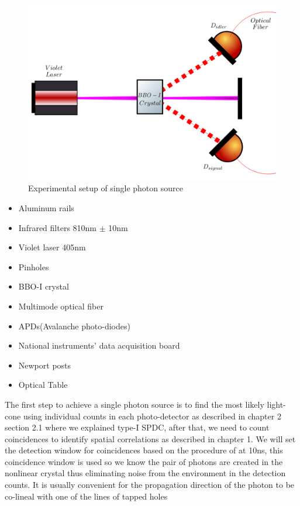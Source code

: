 \documentclass{book}
\begin{document}
\begin{figure}[!htb]
\centering
\includegraphics[width=\linewidth]{images/SPDC_exp.png}
\caption{Experimental setup of single photon source}
\label{single}
\end{figure}



\begin{itemize}

\item Aluminum rails
\item Infrared filters 810nm $\pm$ 10nm
\item Violet laser 405nm
\item Pinholes
\item BBO-I crystal
\item Multimode optical fiber
\item APDs(Avalanche photo-diodes)
\item National instruments' data acquisition board
\item Newport posts
\item Optical Table

\end{itemize}

The first step to achieve a single photon source is to find the most likely light-cone using individual counts in each photo-detector as described in chapter 2 section 2.1 where we explained type-I SPDC, after that, we need to count coincidences to identify spatial correlations as described in chapter 1. We will set the detection window for coincidences based on the procedure of \cite{pearson} at 10ns, this coincidence window is used so we know the pair of photons are created in the nonlinear crystal thus eliminating noise from the environment in the detection counts. It is usually convenient for the propagation direction of the photon to be co-lineal with one of the lines of tapped holes
\end{document}
